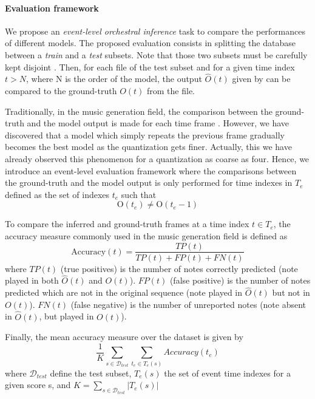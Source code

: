 \documentclass[twoside,twocolumn]{article}
\begin{document}
\paragraph{Evaluation framework}
We propose an \textit{event-level orchestral inference} task to compare the performances of different models.
The proposed evaluation consists in splitting the database between a \textit{train} and a \textit{test} subsets. Note that those two subsets must be carefully kept disjoint \cite{bishop2006pattern}. Then, for each file of the test subset and for a given time index $t > N$, where N is the order of the model, the output $\hat{O}(t)$ given by  can be compared to the ground-truth $O(t)$ from the file.

Traditionally, in the music generation field, the comparison between the ground-truth and the model output is made for each time frame \cite{DBLP:journals/corr/YaoCVDD15,boulanger2012modeling,lavrenko2003polyphonic}. However, we have discovered that a model which simply repeats the previous frame gradually becomes the best model as the quantization gets finer. Actually, this we have already observed this phenomenon for a quantization as coarse as four.
Hence, we introduce an event-level evaluation framework where the comparisons between the ground-truth and the model output is only performed for time indexes in $T_e$ defined as the set of indexes $t_{e}$ such that
\[\text{O}(t_{e}) \neq \text{O}(t_{e} - 1)\]

To compare the inferred and ground-truth frames at a time index $t \in T_e$, the accuracy measure commonly used in the music generation field \cite{DBLP:journals/corr/YaoCVDD15,boulanger2012modeling,lavrenko2003polyphonic} is defined as
\begin{equation}
\text{Accuracy}(t)  = \frac{TP(t)}{TP(t) + FP(t) + FN(t)}
\label{eq:accuracy}
\end{equation}
where $TP(t)$ (true positives) is the number of notes correctly predicted (note played in both $\hat{O}(t)$ and $O(t)$). $FP(t)$ (false positive) is the number of notes predicted which are not in the original sequence (note played in $\hat{O}(t)$ but not in $O(t)$). $FN(t)$ (false negative) is the number of unreported notes (note absent in $\hat{O}(t)$, but played in $O(t)$).

Finally, the mean accuracy measure over the dataset is given by
\begin{equation}
\frac{1}{K} \sum_{s \in \mathcal{D}_{test}} \sum_{t_e \in T_e(s)} Accuracy(t_e)
\end{equation}
where $\mathcal{D}_{test}$ define the test subset, $T_{e}(s)$ the set of event time indexes for a given score s, and $K = \sum_{s \in \mathcal{D}_{test}} |T_e(s)|$
\end{document}
